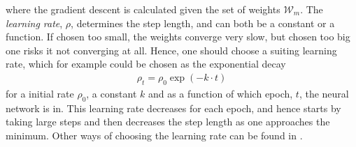 where the gradient descent is calculated given the set of weights $\mathcal{W}_m$. The \emph{learning rate}, $\rho$, determines the step length, and can both be a constant or a function. If chosen too small, the weights converge very slow, but chosen too big one risks it not converging at all. Hence, one should choose a suiting learning rate, which for example could be chosen as the exponential decay
\begin{align*}
    \rho_t = \rho_0 \exp{(-k \cdot t)}
\end{align*}
for a initial rate $\rho_0$, a constant $k$ and as a function of which epoch, $t$, the neural network is in. This learning rate decreases for each epoch, and hence starts by taking large steps and then decreases the step length as one approaches the minimum. Other ways of choosing the learning rate can be found in \citep[p. 135-141]{NNDL}. 

